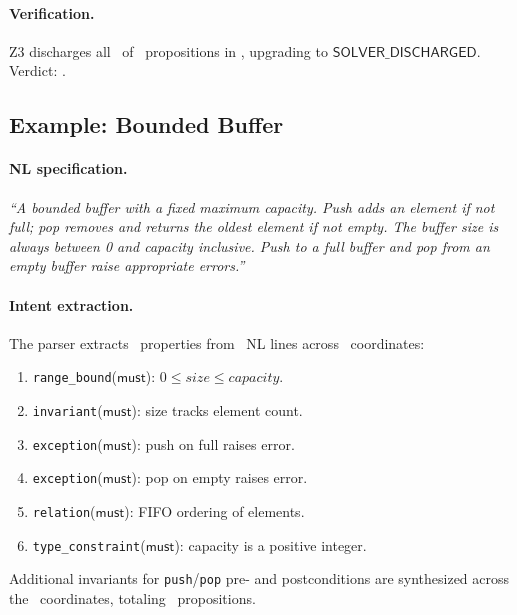 \documentclass[11pt]{article}
\newcommand{\SolverDisch}{\mathsf{SOLVER\_DISCHARGED}}
\begin{document}
\paragraph{Verification.}
Z3 discharges all \ppLXXnlsortedlistOk\ of
\ppLXXnlsortedlistProps\ propositions in
\ppLXXnlsortedlistTime, upgrading to $\SolverDisch$.
Verdict: \ppLXXnlsortedlistVerdict.

\subsection{Example: Bounded Buffer}\label{sec:ex-buffer}

\paragraph{NL specification.}
\emph{``A bounded buffer with a fixed maximum capacity.  Push adds an
element if not full; pop removes and returns the oldest element if not
empty.  The buffer size is always between 0 and capacity inclusive.
Push to a full buffer and pop from an empty buffer raise appropriate
errors.''}

\paragraph{Intent extraction.}
The parser extracts \ppLXXnlboundedbufferProps\ properties from
\ppLXXnlboundedbufferNlLines\ NL lines across
\ppLXXnlboundedbufferCoords\ coordinates:
\begin{enumerate}[noitemsep]
  \item \texttt{range\_bound}($\textsf{must}$):
        $0 \leq \mathit{size} \leq \mathit{capacity}$.
  \item \texttt{invariant}($\textsf{must}$): size tracks element count.
  \item \texttt{exception}($\textsf{must}$): push on full raises error.
  \item \texttt{exception}($\textsf{must}$): pop on empty raises error.
  \item \texttt{relation}($\textsf{must}$): FIFO ordering of elements.
  \item \texttt{type\_constraint}($\textsf{must}$): capacity is a
        positive integer.
\end{enumerate}
Additional invariants for \texttt{push}/\texttt{pop} pre- and
postconditions are synthesized across the
\ppLXXnlboundedbufferCoords\ coordinates, totaling
\ppLXXnlboundedbufferProps\ propositions.
\end{document}
